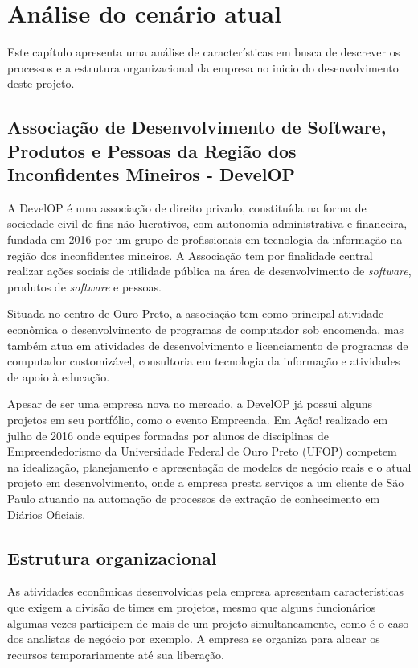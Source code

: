\documentclass[
	12pt,				%
	openright,			%
	oneside,			%
	a4paper,			%
	english,			%
	french,				%
	spanish,			%
	brazil,				%
	]{abntex2}
\begin{document}
\chapter{Análise do cenário atual}

Este capítulo apresenta uma análise de características em busca de descrever os processos e a estrutura organizacional da empresa no inicio do desenvolvimento deste projeto.

\section{Associação de Desenvolvimento de Software, Produtos e Pessoas da Região dos Inconfidentes Mineiros - DevelOP}

A DevelOP é uma associação de direito privado, constituída na forma de sociedade civil de fins não lucrativos, com autonomia administrativa e financeira, fundada em 2016 por um grupo de profissionais em tecnologia da informação na região dos inconfidentes mineiros. A Associação tem por finalidade central realizar ações sociais de utilidade pública na área de desenvolvimento de \textit{software}, produtos de \textit{software} e pessoas.

Situada no centro de Ouro Preto, a associação tem como principal atividade econômica o desenvolvimento de programas de computador sob encomenda, mas também atua em atividades de desenvolvimento e licenciamento de programas de computador customizável, consultoria em tecnologia da informação e atividades de apoio à educação.

Apesar de ser uma empresa nova no mercado, a DevelOP já possui alguns projetos em seu portfólio, como o evento Empreenda. Em Ação! realizado em julho de 2016 onde equipes formadas por alunos de disciplinas de Empreendedorismo da Universidade Federal de Ouro Preto (UFOP) competem na idealização, planejamento e apresentação de modelos de negócio reais e o atual projeto em desenvolvimento, onde a empresa presta serviços a um cliente de São Paulo atuando na automação de processos de extração de conhecimento em Diários Oficiais.

\section{Estrutura organizacional}

As atividades econômicas desenvolvidas pela empresa apresentam características que exigem a divisão de times em projetos, mesmo que alguns funcionários algumas vezes participem de mais de um projeto simultaneamente, como é o caso dos analistas de negócio por exemplo. A empresa se organiza para alocar os recursos temporariamente até sua liberação.
\end{document}

